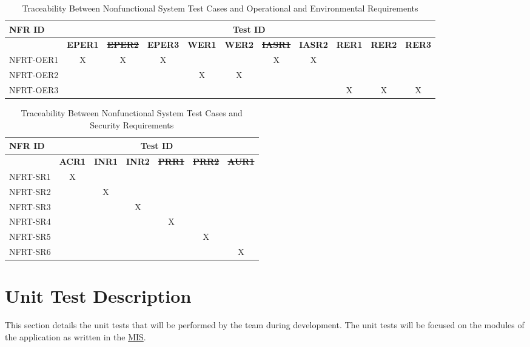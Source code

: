 \documentclass[12pt, titlepage]{article}
\begin{document}
\begin{landscape}
  \begin{longtable}{|l|cccccccccc|}
		\caption{Traceability Between Nonfunctional System Test Cases and Operational and Environmental Requirements} \\
		\hline
    \textbf{NFR ID}   & \multicolumn{10}{c|}{\textbf{Test ID}} \\
    \hline
    ~ & \textbf{EPER1} & \sout{\textbf{EPER2}} & \textbf{EPER3} & \textbf{WER1} & \textbf{WER2} & \sout{\textbf{IASR1}} & \textbf{IASR2} & \textbf{RER1} & \textbf{RER2} & \textbf{RER3} \\
    \hline
    NFRT-OER1 & X & X & X & ~ & ~ & X & X & ~ & ~ & ~ \\
    NFRT-OER2 & ~ & ~ & ~ & X & X & ~ & ~ & ~ & ~ & ~ \\
    NFRT-OER3 & ~ & ~ & ~ & ~ & ~ & ~ & ~ & X & X & X \\
    \hline
  \end{longtable}

  \begin{longtable}{|l|cccccc|}
		\caption{Traceability Between Nonfunctional System Test Cases and Security Requirements} \\
		\hline
    \textbf{NFR ID}   & \multicolumn{6}{c|}{\textbf{Test ID}} \\
    \hline
    ~ & \textbf{ACR1} & \textbf{INR1} & \textbf{INR2} & \sout{\textbf{PRR1}} & \sout{\textbf{PRR2}} & \sout{\textbf{AUR1}} \\
    \hline
    NFRT-SR1 & X & ~ & ~ & ~ & ~ & ~ \\
    NFRT-SR2 & ~ & X & ~ & ~ & ~ & ~ \\
    NFRT-SR3 & ~ & ~ & X & ~ & ~ & ~ \\
    NFRT-SR4 & ~ & ~ & ~ & X & ~ & ~ \\
    NFRT-SR5 & ~ & ~ & ~ & ~ & X & ~ \\
    NFRT-SR6 & ~ & ~ & ~ & ~ & ~ & X \\
    \hline
  \end{longtable}
\end{landscape}

\section{Unit Test Description}

This section details the unit tests that will be performed by the team during development. The
unit tests will be focused on the modules of the application as written in the
\href{https://github.com/r-yeh/grocery-spending-tracker/blob/master/docs/Design/SoftDetailedDes/MIS.pdf}{MIS}.
\end{document}
